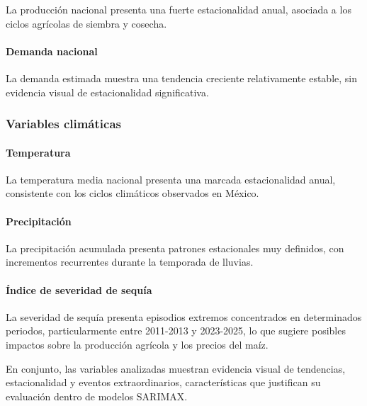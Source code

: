 \documentclass[11pt]{article}
\begin{document}
La producción nacional presenta una fuerte estacionalidad anual,
asociada a los ciclos agrícolas de siembra y cosecha.

\hypertarget{demanda-nacional}{%
\paragraph{Demanda nacional}\label{demanda-nacional}}

La demanda estimada muestra una tendencia creciente relativamente
estable, sin evidencia visual de estacionalidad significativa.

\hypertarget{variables-climuxe1ticas}{%
\subsubsection{Variables climáticas}\label{variables-climuxe1ticas}}

\hypertarget{temperatura}{%
\paragraph{Temperatura}\label{temperatura}}

La temperatura media nacional presenta una marcada estacionalidad anual,
consistente con los ciclos climáticos observados en México.

\hypertarget{precipitaciuxf3n}{%
\paragraph{Precipitación}\label{precipitaciuxf3n}}

La precipitación acumulada presenta patrones estacionales muy definidos,
con incrementos recurrentes durante la temporada de lluvias.

\hypertarget{uxedndice-de-severidad-de-sequuxeda}{%
\paragraph{Índice de severidad de
sequía}\label{uxedndice-de-severidad-de-sequuxeda}}

La severidad de sequía presenta episodios extremos concentrados en
determinados periodos, particularmente entre 2011-2013 y 2023-2025, lo
que sugiere posibles impactos sobre la producción agrícola y los precios
del maíz.

En conjunto, las variables analizadas muestran evidencia visual de
tendencias, estacionalidad y eventos extraordinarios, características
que justifican su evaluación dentro de modelos SARIMAX.
\end{document}
